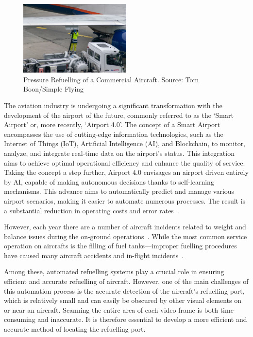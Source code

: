\documentclass[12pt,oneside]{book} %
\begin{document}
\begin{figure}[H]
    \centering
    \includegraphics[width=0.5\textwidth]{figures/pressure-refuelling.jpeg}
    \caption{Pressure Refuelling of a Commercial Aircraft. Source: Tom Boon/Simple Flying}\label{fig:pressure-refuelling}
\end{figure}

\newpage
The aviation industry is undergoing a significant transformation with the
development of the airport of the future, commonly referred to as the `Smart
Airport’ or, more recently, `Airport 4.0’. The concept of a Smart Airport
encompasses the use of cutting-edge information technologies, such as the
Internet of Things (IoT), Artificial Intelligence (AI), and Blockchain, to
monitor, analyze, and integrate real-time data on the airport's status. This
integration aims to achieve optimal operational efficiency and enhance the
quality of service. Taking the concept a step further, Airport 4.0 envisages an
airport driven entirely by AI, capable of making autonomous decisions thanks to
self-learning mechanisms. This advance aims to automatically predict and manage
various airport scenarios, making it easier to automate numerous processes. The
result is a substantial reduction in operating costs and error
rates~\cite{10.1007/978-981-16-5943-0_26}.

However, each year there are a number of aircraft incidents related to weight
and balance issues during the on-ground
operations~\cite{doi:10.1080/13669877.2013.879493}. While the most common
service operation on aircrafts is the filling of fuel tanks—improper fuelling
procedures have caused many aircraft accidents and in-flight
incidents~\cite{CostsOfUnsafetyAviation}.

Among these, automated refuelling systems play a crucial role in ensuring
efficient and accurate refuelling of aircraft. However, one of the main
challenges of this automation process is the accurate detection of the
aircraft's refuelling port, which is relatively small and can easily be
obscured by other visual elements on or near an aircraft. Scanning the entire
area of each video frame is both time-consuming and inaccurate. It is therefore
essential to develop a more efficient and accurate method of locating the
refuelling port.
\end{document}
